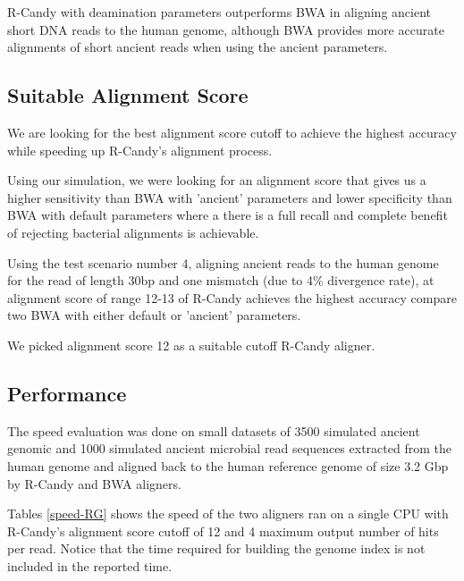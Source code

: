 \documentclass[11pt,a4paper]{report}
\begin{document}
R-Candy with deamination parameters outperforms BWA in aligning ancient 
short DNA reads to the human genome, although 
BWA provides more accurate alignments of short 
ancient reads when using the ancient parameters. 
 



\subsection{Suitable Alignment Score} 
\label{Suitable Alignment Score}

We are looking for the best alignment score cutoff to achieve the 
highest accuracy while speeding up R-Candy's alignment process.

Using our simulation, we were looking for an alignment score that 
gives us a higher sensitivity than BWA with 'ancient' parameters 
and lower specificity than BWA with default parameters where a
there is a full recall and complete benefit of rejecting bacterial 
alignments is achievable.

Using the test scenario number 4, aligning ancient reads to the human
genome for the read of length 30bp and one mismatch (due to 4\% 
divergence rate), at alignment score of range 12-13 of R-Candy 
achieves the highest accuracy compare two BWA with either default
or 'ancient' parameters.

We picked alignment score 12 as a suitable cutoff R-Candy aligner. 


\subsection{Performance} \label{Performance}

The speed evaluation was done on small datasets of 3500 simulated ancient 
genomic and 1000 simulated ancient microbial read sequences extracted from
the human genome and aligned back to the human reference genome of size 3.2 
Gbp by R-Candy and BWA aligners.

Tables \ref{speed-RG} shows the speed of 
the two aligners ran on a single CPU with R-Candy's alignment score cutoff 
of 12 and 4 maximum output number of hits per read.
Notice that the time required for building the genome index is 
not included in the reported time.\\
\end{document}
